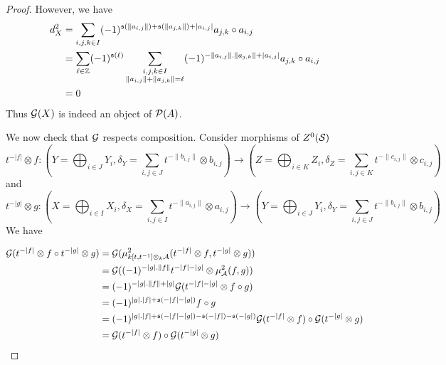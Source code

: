 \documentclass[12pt]{article}
\begin{document}
\begin{proof}
		\noindent However, we have 
		\begin{align*}
			d_X^2 &= \sum_{i,j,k \in I} (-1)^{\mathfrak{s}(\|a_{i,j}\|) + \mathfrak{s}(\|a_{j,k}\|) + |a_{i,j}|} a_{j,k} \circ a_{i,j} \\
			&= \sum_{\ell \in \mathbb{Z}} (-1)^{\mathfrak{s}(\ell)} \sum_{\substack{i,j,k \in I \\ \|a_{i,j}\| + \|a_{j,k}\| = \ell}} (-1)^{-\|a_{i,j}\|.\|a_{j,k}\| + |a_{i,j}|}  a_{j,k} \circ a_{i,j} \\
			&= 0
		\end{align*}
		\noindent Thus ${\cal{G}}(X)$ is indeed an object of ${\cal{P}}(A)$.
		
		
		\noindent We now check that ${\cal{G}}$ respects composition. Consider morphisms of $Z^{0}({\cal{S}})$
		\[t^{-|f|} \otimes f: (Y = \bigoplus_{i \in J} Y_i,\delta_Y = \sum_{i,j \in J} t^{- \|b_{i,j}\|} \otimes b_{i,j}) \to (Z = \bigoplus_{i \in K} Z_i,\delta_Z = \sum_{i,j \in K} t^{- \|c_{i,j}\|} \otimes c_{i,j})\]
		 and
		\[t^{-|g|} \otimes g: (X = \bigoplus_{i \in I} X_i,\delta_X = \sum_{i,j \in I} t^{- \|a_{i,j}\|} \otimes a_{i,j}) \to (Y = \bigoplus_{i \in J} Y_i,\delta_Y = \sum_{i,j \in J} t^{- \|b_{i,j}\|} \otimes b_{i,j})\]
		We have
		
		\begin{align*}
			{\cal{G}}(t^{-|f|} \otimes f \circ t^{-|g|} \otimes g) &= {\cal{G}}(\mu^2_{k[t,t^{-1}]\otimes_k {\cal{A}}}(t^{-|f|} \otimes f,t^{-|g|} \otimes g)) \\
			&= {\cal{G}}((-1)^{-|g|.\|f\|}t^{-|f| - |g|} \otimes \mu^2_{\cal{A}}(f,g)) \\
			&= (-1)^{-|g|.\|f\| + |g|} {\cal{G}}(t^{-|f| - |g|} \otimes f \circ g) \\
			&= (-1)^{|g|.|f| + \mathfrak{s}(-|f|-|g|)} f \circ g \\
			&= (-1)^{|g|.|f|+ \mathfrak{s}(-|f|-|g|) - \mathfrak{s}(-|f|) - \mathfrak{s}(-|g|)} {\cal{G}}(t^{-|f|} \otimes f) \circ {\cal{G}}(t^{-|g|} \otimes g) \\
			&= {\cal{G}}(t^{-|f|} \otimes f) \circ {\cal{G}}(t^{-|g|} \otimes g)
		\end{align*} 
		

\end{proof}
\end{document}
